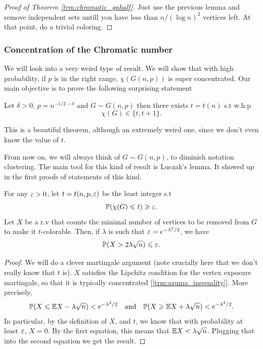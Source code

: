 \begin{proof}
	[Proof of Theorem \ref{trm:chromatic_gnhalf}]
	Just use the previous lemma and remove independent sets untill you
	have less than $n/(\log n)^2$ vertices left. At that point, do a
	trivial coloring.
\end{proof}

\subsubsection{Concentration of the Chromatic number}
We will look into a very weird type of result. We will show that with
high probability, if $p$ is in the right range,
$\chi(G(n,p))$ is super concentrated. Our main objective is to prove
the following surprising statement
\begin{theorem}
	\label{trm:chromatic_concentration_alon_krivilevich}
	Let $\delta > 0$, $p = n^{-1/2 - \delta}$ and $G \sim G(n,p)$ then
	there exists $t = t(n)$ s.t w.h.p
	\[
		\chi(G) \in \{t, t + 1\}.
	\]
\end{theorem}
\begin{remark}
	This is a beautiful theorem, although an extremely weird one, since
	we don't even know the value of $t$.
\end{remark}
From now on, we will always think of $G \sim G(n,p)$, to diminish
notation clustering.
The main tool for this kind of result is Luczak's lemma. It showed up
in the first proofs of statements of this kind.

\begin{lemma}[Luczak]
	\label{lemma:luczak_martingale}
	For any $\varepsilon > 0$, let $t = t(n,p,\varepsilon)$ be the least integer s.t
	\[
		\mathbb{P}(\chi(G) \leqslant t) \geqslant \varepsilon.
	\]
	Let $X$ be a r.v that counts the minimal number of vertices to be
	removed from $G$ to make it $t$-colorable. Then, if $\lambda$ is such that
	$\varepsilon = e^{-\lambda^2/2}$, we have
	\[
		\mathbb{P}(X > 2\lambda \sqrt{n}) \leqslant \varepsilon.
	\]
\end{lemma}
\begin{proof}
	We will do a clever martingale argument (note crucially here that we
	don't really know that $t$ is). $X$ satisfies the Lipchitz condition
	for the vertex exposure martingale, so that it is typically
	concentrated [\ref{trm:azuma_inequality}]. More precisely,
	\begin{align}
		\mathbb{P}(X \leqslant \mathbb{E} X - \lambda \sqrt{n} ) < e^{-\lambda^2/2} \quad
		\text{and} \quad \mathbb{P}(X \geqslant \mathbb{E} X + \lambda \sqrt{n}) < e^{-\lambda^2/2}.
	\end{align}
	In particular, by the definition of $X$, and $t$, we know that with
	probability at least $\varepsilon$, $X = 0$. By the first equation,
	this means that $\mathbb{E} X < \lambda\sqrt{n}$. Plugging that into the
	second equation we get the result.
\end{proof}


